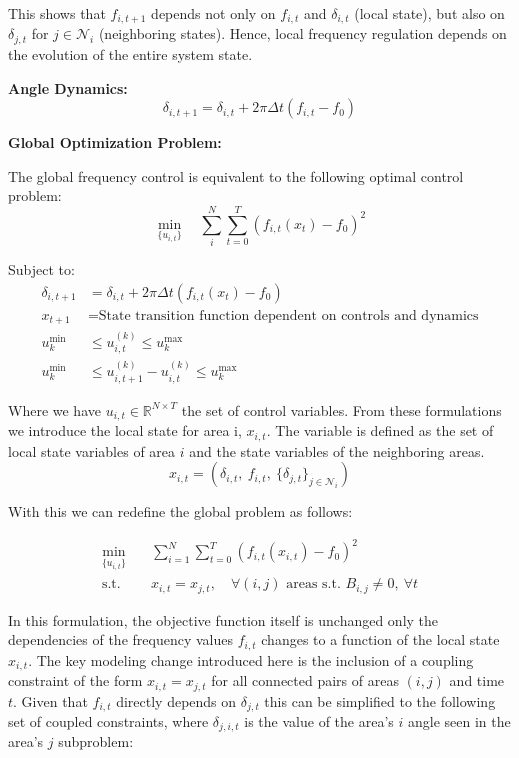 \documentclass{article}
\begin{document}
This shows that $f_{i,t+1}$ depends not only on $f_{i,t}$ and $\delta_{i,t}$ (local state), but also on $\delta_{j,t}$ for $j \in \mathcal{N}_i$ (neighboring states). Hence, local frequency regulation depends on the evolution of the entire system state.

\textbf{Angle Dynamics:}
\begin{equation}
    \delta_{i,t+1} = \delta_{i,t} + 2\pi \Delta t (f_{i,t} - f_0)
\end{equation}

\textbf{Global Optimization Problem:}

The global frequency control is equivalent to the following optimal control problem:
\begin{equation}
\min_{\{u_{i,t}\}} \quad \sum_i^N \sum_{t=0}^{T} \left( f_{i,t}(x_t) - f_0 \right)^2
\end{equation}

Subject to:
\begin{align}
    \delta_{i,t+1} &= \delta_{i,t} + 2\pi \Delta t (f_{i,t}(x_t) - f_0) \\
    x_{t+1} &= \text{State transition function dependent on controls and dynamics} \\
    u^{\min}_k &\leq u_{i,t}^{(k)} \leq u^{\max}_k \\
    u^{\min}_k &\leq u_{i,t+1}^{(k)} - u_{i,t}^{(k)} \leq u^{\max}_k
\end{align}

Where we have $u_{i,t} \in \mathbb{R}^{N \times T}$ the set of control variables. From these formulations we introduce the local state for area i, $x_{i,t}$. The variable is defined as the set of local state variables of area $i$ and the state variables of the neighboring areas.
\[
x_{i,t} = \left( \delta_{i,t},\ f_{i,t},\ \{ \delta_{j,t} \}_{j \in \mathcal{N}_i} \right)
\] 

With this we can redefine the global problem as follows:

\begin{align}
\min_{\{u_{i,t}\}} \quad & \sum_{i=1}^{N} \sum_{t=0}^{T} \left( f_{i,t}(x_{i,t}) - f_0 \right)^2 \label{eq:decentralized_obj} \\
\text{s.t.} \quad & x_{i,t} = x_{j,t}, \quad \forall (i,j) \text{ areas s.t. } B_{i,j} \neq 0,\ \forall t \label{eq:coupling_constraint}
\end{align}

In this formulation, the objective function itself is unchanged only the dependencies of the frequency values $f_{i,t}$ changes to a function of the local state $x_{i,t}$. The key modeling change introduced here is the inclusion of a coupling constraint of the form $x_{i,t} = x_{j,t}$ for all connected pairs of areas $(i,j)$ and time $t$. Given that $f_{i,t}$ directly depends on $\delta_{j,t}$ this can be simplified to the following set of coupled constraints, where $\delta_{j, i, t}$ is the value of the area's $i$ angle seen in the area's $j$ subproblem:
\end{document}
